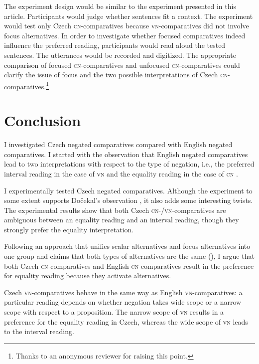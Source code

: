 \documentclass[output=paper,
]{langscibook}
\begin{document}
The experiment design would be similar to the experiment presented in this article. Participants would judge whether sentences fit a context. The experiment would test only Czech \textsc{cn-}comparatives because \textsc{vn-}comparatives did not involve focus alternatives. In order to investigate whether focused comparatives indeed influence the preferred reading, participants would read aloud the tested sentences. The utterances would be recorded and digitized. The appropriate comparison of focused \textsc{cn-}comparatives and unfocused \textsc{cn-}comparatives could clarify the issue of focus and the two possible interpretations of Czech \textsc{cn-}comparatives.\footnote{Thanks to an anonymous reviewer for raising this point.} 


\section{Conclusion}
I investigated Czech negated comparatives compared with English negated comparatives. I started with the observation that English negated comparatives lead to two interpretations with respect to the type of negation, i.e., the preferred interval reading in the case of \textsc{vn} and the equality reading in the case of \textsc{cn} \citep{nouwen2008upper}. 

I experimentally tested Czech negated comparatives. Although the experiment to some extent supports Dočekal's observation \citep{dovcekal2017upper}, it also adds some interesting twists. The experimental results show that both Czech \textsc{cn-/vn-}compa\-ratives are ambiguous between an equality reading and an interval reading, though they strongly prefer the equality interpretation. 

Following an approach that unifies scalar alternatives and focus alternatives into one group and claims that both types of alternatives are the same (\citealt{katzir2007structurally,fox2011characterization,fox2018economy}), I argue that both Czech \textsc{cn-}comparatives and English \textsc{cn-}comparatives result in the preference for equality reading because they activate alternatives.

Czech \textsc{vn-}comparatives behave in the same way as English \textsc{vn-}comparatives: a particular reading depends on whether negation takes wide scope or a narrow scope with respect to a proposition. The narrow scope of \textsc{vn} results in a preference for the equality reading in Czech, whereas the wide scope of \textsc{vn} leads to the interval reading. 
\end{document}
